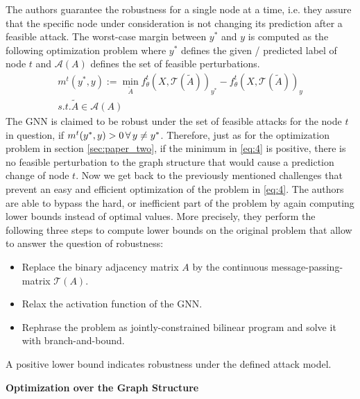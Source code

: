 \documentclass[a4paper,preprint]{sig-alternate}
\begin{document}
The authors guarantee the robustness for a single node at a time, i.e. they assure that the specific node under 
consideration is not changing its prediction after a feasible attack.
The worst-case margin between $y^{\ast}$ and $y$ is computed as the following optimization problem where $y^{\ast}$ defines the given / predicted 
label of node $t$ and $\mathcal{A}(A)$ defines the set of feasible perturbations.
\begin{gather}
\label{eq:4}
    m^t (y^{\ast}, y) := \min_{\tilde{A}} f_{\theta}^t (X, \mathcal{T}(\tilde{A}))_{y^{\ast}}
    - f_{\theta}^t (X, \mathcal{T}(\tilde{A}))_y \\
    s.t. \tilde{A} \in \mathcal{A}(A) \nonumber
\end{gather}
The GNN is claimed to be robust under the set of feasible attacks for the node $t$ in question,
if $m^t (y^{\ast}, y) > 0 \thinspace \forall \thinspace y \neq y^{\ast}$.
Therefore, just as for the optimization problem in section \ref{sec:paper_two}, if the minimum in \ref{eq:4} is positive, 
there is no feasible perturbation to the graph structure that would cause a prediction change of node $t$. \cite{10.1145/3394486.3403217}\newline
Now we get back to the previously mentioned challenges that prevent an easy and efficient optimization 
of the problem in \ref{eq:4}.
The authors are able to bypass the hard, or inefficient part of the problem by again computing lower bounds instead of optimal values.
More precisely, they perform the following three steps to compute lower bounds on the original problem that
allow to answer the question of robustness:
\begin{itemize}
    \item Replace the binary adjacency matrix $A$ by the continuous message-passing-matrix $\mathcal{T}(A)$.
    \item Relax the activation function of the GNN.
    \item Rephrase the problem as jointly-constrained bilinear program and solve it with branch-and-bound.
\end{itemize}
A positive lower bound indicates robustness under the defined attack model. \cite{10.1145/3394486.3403217}\newline

\textbf{Optimization over the Graph Structure}\newline
\end{document}
